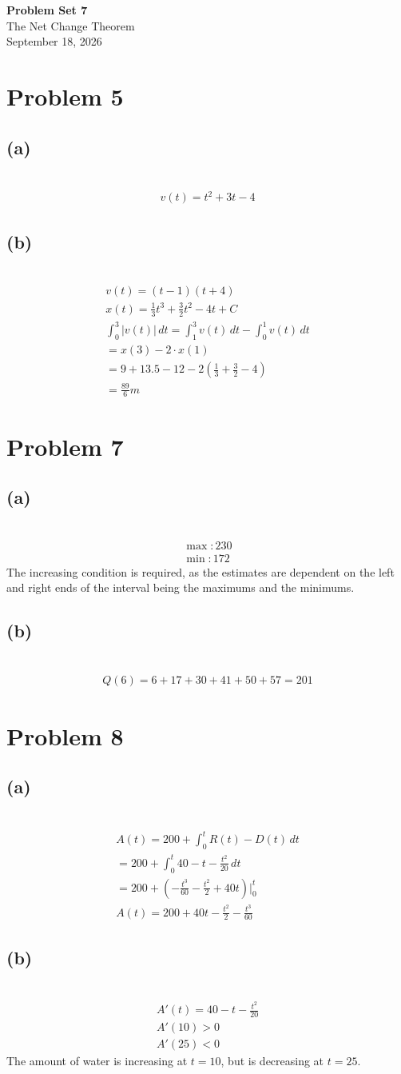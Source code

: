\documentclass[12pt]{article}
\newcommand{\vem}{\vspace{0.5em}}
\newcommand{\problem}[1]{\section{Problem #1}}
\newcommand{\subproblem}[1]{\subsection{(#1)} \,}
\begin{document}
\vspace*{0cm}

\begin{center}
    {\Large \bfseries Problem Set 7} \\[0.5cm]
    {\large The Net Change Theorem} \\[0.35cm]
    {\normalsize September 18, 2026}
\end{center}


\problem{5}

\subproblem{a}
\begin{gather*}
    \boxed{v(t)=t^2+3t-4}
\end{gather*}

\subproblem{b}
\begin{gather*}
    v(t)=(t-1)(t+4)\\
    x(t)=\frac{1}{3}t^3+\frac{3}{2}t^2-4t+C\\
    \int_0^3 |v(t)|\, dt = \int_1^3 v(t)\, dt- \int_0^1 v(t)\, dt\\
    =x(3)-2\cdot x(1) \\
    =9+13.5-12-2(\frac{1}{3}+\frac{3}{2}-4)\\
    =\boxed{\frac{89}{6}m}
\end{gather*}

\problem{7}

\subproblem{a}
\begin{gather*}
    \max: 230\\
    \min: 172
\end{gather*}
The increasing condition is required, as the estimates are dependent on the left and right ends of the interval being the maximums and the minimums. \vem

\subproblem{b}
\begin{gather*}
    Q(6)=6+17+30+41+50+57=201
\end{gather*}

\problem{8}

\subproblem{a}
\begin{gather*}
    A(t)=200+\int_0^t R(t)-D(t) \, dt\\
    =200+\int_0^t40-t-\frac{t^2}{20}\, dt\\
    =200+(-\frac{t^3}{60} - \frac{t^2}{2}+40t) \Big|^t_0\\
    A(t)=200+40t-\frac{t^2}{2}-\frac{t^3}{60}
\end{gather*}

\subproblem{b}
\begin{gather*}
    A'(t)=40-t-\frac{t^2}{20}\\
    A'(10)>0\\
    A'(25)<0
\end{gather*}
The amount of water is increasing at $t=10$, but is decreasing at $t=25$.\vem
\end{document}
